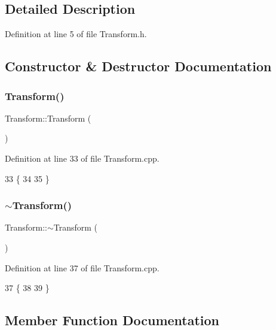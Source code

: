 \subsection{Detailed Description}


Definition at line 5 of file Transform.\+h.



\subsection{Constructor \& Destructor Documentation}
\mbox{\label{classTransform_aa08ca4266efabc768973cdeea51945ab}} 
\subsubsection{\texorpdfstring{Transform()}{Transform()}}
{\footnotesize\ttfamily Transform\+::\+Transform (\begin{DoxyParamCaption}{ }\end{DoxyParamCaption})}



Definition at line 33 of file Transform.\+cpp.


\begin{DoxyCode}
33                       \{
34 
35 \}
\end{DoxyCode}
\mbox{\label{classTransform_aa72e286c069850db80927b0e6554cd3e}} 
\subsubsection{\texorpdfstring{$\sim$\+Transform()}{~Transform()}}
{\footnotesize\ttfamily Transform\+::$\sim$\+Transform (\begin{DoxyParamCaption}{ }\end{DoxyParamCaption})}



Definition at line 37 of file Transform.\+cpp.


\begin{DoxyCode}
37                        \{
38 
39 \}
\end{DoxyCode}


\subsection{Member Function Documentation}
\mbox{\label{classTransform_ac71c79e10f11990100cd219f25879dd0}} 
